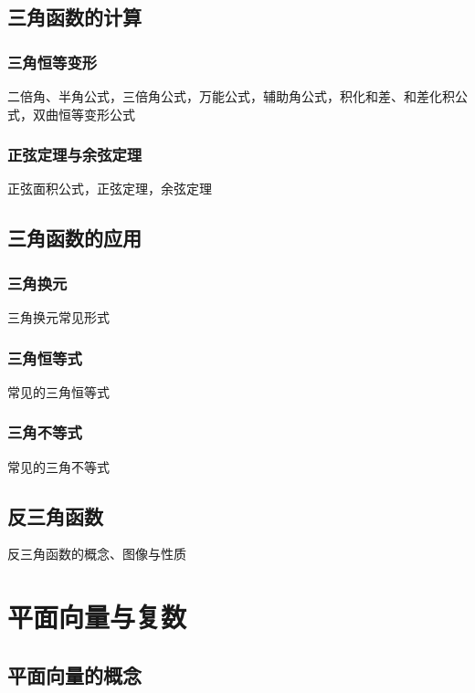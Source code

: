 \documentclass[lang=cn, zihao=4.5]{elegantbook}
\begin{document}
\section{三角函数的计算}

\subsection{三角恒等变形}

二倍角、半角公式，三倍角公式，万能公式，辅助角公式，积化和差、和差化积公式，双曲恒等变形公式

\subsection{正弦定理与余弦定理}

正弦面积公式，正弦定理，余弦定理

\section{三角函数的应用}

\subsection{三角换元}

三角换元常见形式

\subsection{三角恒等式}

常见的三角恒等式

\subsection{三角不等式}

常见的三角不等式

\section{反三角函数}

反三角函数的概念、图像与性质

\chapter{平面向量与复数}

\section{平面向量的概念}
\end{document}

